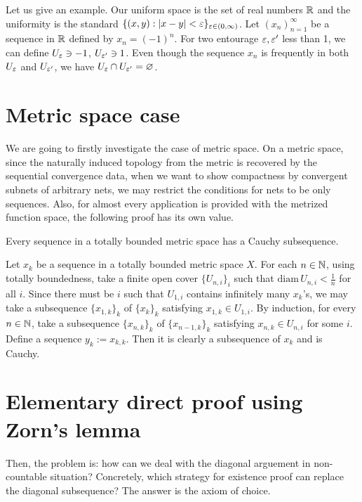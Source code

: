 \documentclass[12pt]{article}
\begin{document}
Let us give an example.
Our uniform space is the set of real numbers $\mathbb{R}$ and the uniformity is the standard $\{(x,y):|x-y|<\varepsilon\}_{\varepsilon\in(0,\infty)}$.
Let $(x_n)_{n=1}^\infty$ be a sequence in $\mathbb{R}$ defined by $x_n=(-1)^n$.
For two entourage $\varepsilon,\varepsilon'$ less than 1, we can define $U_\varepsilon\ni-1$, $U_{\varepsilon'}\ni1$.
Even though the sequence $x_n$ is frequently in both $U_\varepsilon$ and $U_{\varepsilon'}$, we have $U_\varepsilon\cap U_{\varepsilon'}=\varnothing$.



\section{Metric space case}

We are going to firstly investigate the case of metric space.
On a metric space, since the naturally induced topology from the metric is recovered by the sequential convergence data, when we want to show compactness by convergent subnets of arbitrary nets, we may restrict the conditions for nets to be only sequences.
Also, for almost every application is provided with the metrized function space, the following proof has its own value.


\begin{thm}
Every sequence in a totally bounded metric space has a Cauchy subsequence.
\end{thm}

\begin{pf}
Let $x_k$ be a sequence in a totally bounded metric space $X$.
For each $n\in\mathbb{N}$, using totally boundedness, take a finite open cover $\{U_{n,i}\}_i$ such that $\mathrm{diam}\,U_{n,i}<\frac1n$ for all $i$.
Since there must be $i$ such that $U_{1,i}$ contains infinitely many $x_k$'s, we may take a subsequence $\{x_{1,k}\}_k$ of $\{x_k\}_k$ satisfying $x_{1,k}\in U_{1,i}$.
By induction, for every $n\in\mathbb{N}$, take a subsequence $\{x_{n,k}\}_k$ of $\{x_{n-1,k}\}_k$ satisfying $x_{n,k}\in U_{n,i}$ for some $i$.
Define a sequence $y_k:=x_{k,k}$.
Then it is clearly a subsequence of $x_k$ and is Cauchy.
\end{pf}





\section{Elementary direct proof using Zorn's lemma}

Then, the problem is: how can we deal with the diagonal arguement in non-countable situation?
Concretely, which strategy for existence proof can replace the diagonal subsequence?
The answer is the axiom of choice.
\end{document}

